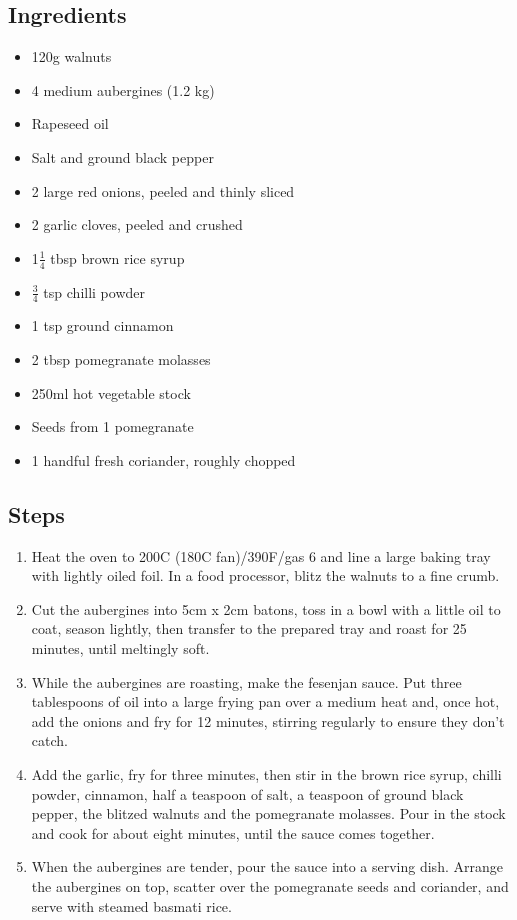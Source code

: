 \documentclass{book}
\begin{document}
\subsection*{Ingredients}
\begin{itemize}
\item 120g walnuts
\item 4 medium aubergines (1.2 kg)
\item Rapeseed oil
\item Salt and ground black pepper
\item 2 large red onions, peeled and thinly sliced
\item 2 garlic cloves, peeled and crushed
\item 1$\frac{1}{4}$ tbsp brown rice syrup
\item $\frac{3}{4}$ tsp chilli powder
\item 1 tsp ground cinnamon
\item 2 tbsp pomegranate molasses
\item 250ml hot vegetable stock
\item Seeds from 1 pomegranate
\item 1 handful fresh coriander, roughly chopped
\end{itemize}

\subsection*{Steps}
\begin{enumerate}
\item Heat the oven to 200C (180C fan)/390F/gas 6 and line a large baking tray with lightly oiled foil. In a food processor, blitz the walnuts to a fine crumb.
\item Cut the aubergines into 5cm x 2cm batons, toss in a bowl with a little oil to coat, season lightly, then transfer to the prepared tray and roast for 25 minutes, until meltingly soft.
\item While the aubergines are roasting, make the fesenjan sauce. Put three tablespoons of oil into a large frying pan over a medium heat and, once hot, add the onions and fry for 12 minutes, stirring regularly to ensure they don’t catch. 
\item Add the garlic, fry for three minutes, then stir in the brown rice syrup, chilli powder, cinnamon, half a teaspoon of salt, a teaspoon of ground black pepper, the blitzed walnuts and the pomegranate molasses. Pour in the stock and cook for about eight minutes, until the sauce comes together.
\item When the aubergines are tender, pour the sauce into a serving dish. Arrange the aubergines on top, scatter over the pomegranate seeds and coriander, and serve with steamed basmati rice.
\end{enumerate}
\newpage
\end{document}
